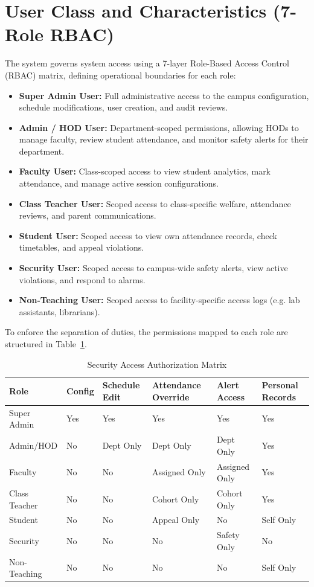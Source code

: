 \documentclass[12pt,a4paper,oneside]{report}
\begin{document}
\section{User Class and Characteristics (7-Role RBAC)}
The system governs system access using a 7-layer Role-Based Access Control (RBAC) matrix, defining operational boundaries for each role:
\begin{itemize}
    \item \textbf{Super Admin User:} Full administrative access to the campus configuration, schedule modifications, user creation, and audit reviews.
    \item \textbf{Admin / HOD User:} Department-scoped permissions, allowing HODs to manage faculty, review student attendance, and monitor safety alerts for their department.
    \item \textbf{Faculty User:} Class-scoped access to view student analytics, mark attendance, and manage active session configurations.
    \item \textbf{Class Teacher User:} Scoped access to class-specific welfare, attendance reviews, and parent communications.
    \item \textbf{Student User:} Scoped access to view own attendance records, check timetables, and appeal violations.
    \item \textbf{Security User:} Scoped access to campus-wide safety alerts, view active violations, and respond to alarms.
    \item \textbf{Non-Teaching User:} Scoped access to facility-specific access logs (e.g. lab assistants, librarians).
\end{itemize}

To enforce the separation of duties, the permissions mapped to each role are structured in Table~\ref{tab:rbac_matrix}.

\begin{table}[htbp]
\caption{Security Access Authorization Matrix}
\centering
\small
{}
\setlength{\tabcolsep}{3.5pt} %
\begin{tabular}{@{}p{0.9in} p{0.5in} p{0.8in} p{0.9in} p{0.9in} p{0.9in}@{}}
\hline
\textbf{Role} & \textbf{Config} & \textbf{Schedule Edit} & \textbf{Attendance Override} & \textbf{Alert Access} & \textbf{Personal Records} \\ \hline
Super Admin & Yes & Yes & Yes & Yes & Yes \\ \hline
Admin/HOD & No & Dept Only & Dept Only & Dept Only & Yes \\ \hline
Faculty & No & No & Assigned Only & Assigned Only & Yes \\ \hline
Class Teacher & No & No & Cohort Only & Cohort Only & Yes \\ \hline
Student & No & No & Appeal Only & No & Self Only \\ \hline
Security & No & No & No & Safety Only & No \\ \hline
Non-Teaching & No & No & No & No & Self Only \\ \hline
\end{tabular}
\label{tab:rbac_matrix}
\end{table}
\end{document}
